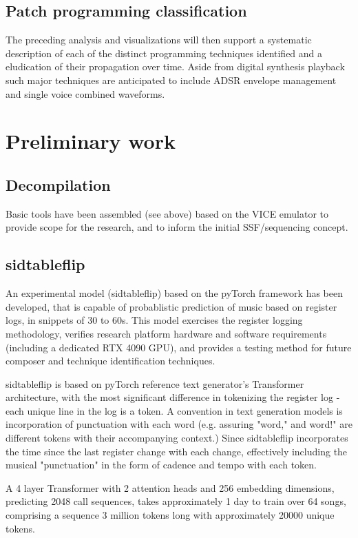 \documentclass[10pt]{article}
\begin{document}
\begin{multicols*}{2}
  \subsection{Patch programming classification}
  The preceding analysis and visualizations will then support
  a systematic description of each of the distinct programming
  techniques identified and a eludication of their propagation
  over time. Aside from digital synthesis playback such major
  techniques are anticipated to include ADSR envelope
  management and single voice combined waveforms.

  \section{Preliminary work}

  \subsection{Decompilation}
  Basic tools have been assembled (see above) based on the VICE
  emulator to provide scope for the research, and to inform
  the initial SSF/sequencing concept.

  \subsection{sidtableflip}
  An experimental model (sidtableflip) based on the pyTorch framework has been
  developed, that is capable of probablistic prediction of music based on
  register logs, in snippets of 30 to 60s. This model exercises the register
  logging methodology, verifies research platform hardware and software requirements
  (including a dedicated RTX 4090 GPU), and provides a testing method for future
  composer and technique identification techniques.

  sidtableflip is based on pyTorch reference text generator's Transformer
  architecture, with the most significant difference in tokenizing the
  register log - each unique line in the log is a token. A convention in text
  generation models is incorporation of punctuation
  with each word (e.g. assuring "word," and word!" are different tokens with
  their accompanying context.) Since sidtableflip incorporates the time since the last
  register change with each change, effectively including the musical "punctuation"
  in the form of cadence and tempo with each token.

  A 4 layer Transformer with 2 attention heads and 256 embedding dimensions,
  predicting 2048 call sequences, takes approximately 1 day to train over 64 songs,
  comprising a sequence 3 million tokens long with approximately 20000 unique tokens.



\end{multicols*}
\end{document}
